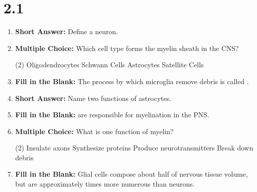 \section*{2.1}
\begin{enumerate}[label=\textbf{Q2.1.\arabic*}]
      \item \textbf{Short Answer:} Define a neuron. \\
      \item \textbf{Multiple Choice:} Which cell type forms the myelin sheath in the CNS?
            \begin{tasks}[label=(\Alph*), label-width=1.5em, item-indent=1.7em](2)
                  \task Oligodendrocytes
                  \task Schwann Cells
                  \task Astrocytes
                  \task Satellite Cells
            \end{tasks}
      \item \textbf{Fill in the Blank:} The process by which microglia remove debris is called \underline{\hspace{3cm}}. \\
      \item \textbf{Short Answer:} Name two functions of astrocytes. \\
      \item \textbf{Fill in the Blank:} \underline{\hspace{3cm}} are responsible for myelination in the PNS. \\
      \item \textbf{Multiple Choice:} What is one function of myelin?
            \begin{tasks}[label=(\Alph*), label-width=1.5em, item-indent=1.7em](2)
                  \task Insulate axons
                  \task Synthesize proteins
                  \task Produce neurotransmitters
                  \task Break down debris
            \end{tasks}
      \item \textbf{Fill in the Blank:} Glial cells compose about half of nervous tissue volume, but are approximately \underline{\hspace{3cm}} times more numerous than neurons. \\


\end{enumerate}
